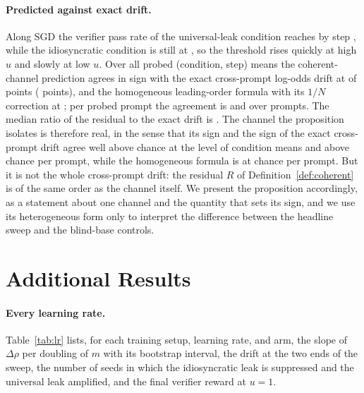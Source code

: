 \paragraph{Predicted against exact drift.} Along SGD the verifier pass rate of the universal-leak condition reaches \ProbeVbarHiLast{} by step \ProbeVbarStepLast{}, while the idiosyncratic condition is still at \ProbeVbarLoLast{}, so the threshold rises quickly at high $u$ and slowly at low $u$. Over all probed (condition, step) means the coherent-channel prediction agrees in sign with the exact cross-prompt log-odds drift at \ProbeSignAgreeCond{} of points (\ProbeNCond{} points), and the homogeneous leading-order formula with its $1/N$ correction at \ProbeSignAgreeLeadCond{}; per probed prompt the agreement is \ProbeSignAgreePts{} and \ProbeSignAgreeLeadPts{} over \ProbeNPts{} prompts. The median ratio of the residual to the exact drift is \ProbeResidShareMedian{}. The channel the proposition isolates is therefore real, in the sense that its sign and the sign of the exact cross-prompt drift agree well above chance at the level of condition means and above chance per prompt, while the homogeneous formula is at chance per prompt. But it is not the whole cross-prompt drift: the residual $R$ of Definition~\ref{def:coherent} is of the same order as the channel itself. We present the proposition accordingly, as a statement about one channel and the quantity that sets its sign, and we use its heterogeneous form only to interpret the difference between the headline sweep and the blind-base controls.

\section{Additional Results}
\label{app:extra}

\paragraph{Every learning rate.} Table~\ref{tab:lr} lists, for each training setup, learning rate, and arm, the slope of $\Delta\rho$ per doubling of $m$ with its bootstrap interval, the drift at the two ends of the sweep, the number of seeds in which the idiosyncratic leak is suppressed and the universal leak amplified, and the final verifier reward at $u=1$.

\begin{table}[htbp]
\centering\footnotesize

\caption{The universality effect at every learning rate. Slopes are per doubling of $m$; intervals are bootstrap $95\%$ over ten seeds. The last column is the final verifier reward at $u=1$ for that arm, with divergent settings marked; per-prompt rewards below $0.9$ are still rising at step \NSteps{}.}
\label{tab:lr}
\end{table}

